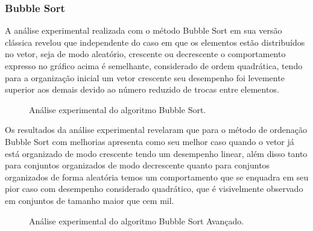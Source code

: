 \documentclass[conference]{IEEEtran}
\begin{document}
\subsubsection{Bubble Sort}

A análise experimental realizada com o método Bubble Sort em sua versão clássica revelou que independente do caso em que os elementos estão distribuídos no vetor, seja de modo aleatório, crescente ou decrescente o comportamento expresso no gráfico acima é semelhante, considerado de ordem quadrática, tendo para a organização inicial um vetor crescente seu desempenho foi levemente superior aos demais devido ao número reduzido de trocas entre elementos.

\begin{figure}
\label{image: graph-bubble}

\centering
{}
\caption{Análise experimental do algoritmo Bubble Sort.}
\end{figure}

Os resultados da análise experimental revelaram que para o método de ordenação Bubble Sort com melhorias apresenta como seu melhor caso quando o vetor já está organizado de modo crescente tendo um desempenho linear, além disso tanto para conjuntos organizados de modo decrescente quanto para conjuntos organizados de forma aleatória temos um comportamento que se enquadra em seu pior caso com desempenho considerado quadrático, que é visivelmente observado em conjuntos de tamanho maior que cem mil.

\begin{figure}
\label{image: graph-bubble-adv}

\caption{Análise experimental do algoritmo Bubble Sort Avançado.}
\end{figure}
\end{document}
